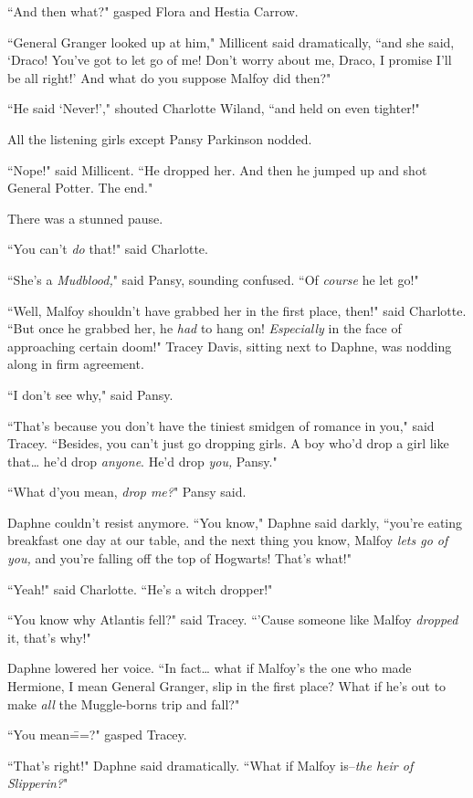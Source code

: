 ``And then what?" gasped Flora and Hestia Carrow.

``General Granger looked up at him," Millicent said dramatically, ``and she said, `Draco! You've got to let go of me! Don't worry about me, Draco, I promise I'll be all right!' And what do you suppose Malfoy did then?"

``He said `Never!'," shouted Charlotte Wiland, ``and held on even tighter!"

All the listening girls except Pansy Parkinson nodded.

``Nope!" said Millicent. ``He dropped her. And then he jumped up and shot General Potter. The end."

There was a stunned pause.

``You can't \emph{do} that!" said Charlotte.

``She's a \emph{Mudblood,}" said Pansy, sounding confused. ``Of \emph{course} he let go!"

``Well, Malfoy shouldn't have grabbed her in the first place, then!" said Charlotte. ``But once he grabbed her, he \emph{had} to hang on! \emph{Especially} in the face of approaching certain doom!" Tracey Davis, sitting next to Daphne, was nodding along in firm agreement.

``I don't see why," said Pansy.

``That's because you don't have the tiniest smidgen of romance in you," said Tracey. ``Besides, you can't just go dropping girls. A boy who'd drop a girl like that{\ldots} he'd drop \emph{anyone}. He'd drop \emph{you,} Pansy."

``What d'you mean, \emph{drop me?}" Pansy said.

Daphne couldn't resist anymore. ``You know," Daphne said darkly, ``you're eating breakfast one day at our table, and the next thing you know, Malfoy \emph{lets go of you,} and you're falling off the top of Hogwarts! That's what!"

``Yeah!" said Charlotte. ``He's a witch dropper!"

``You know why Atlantis fell?" said Tracey. ``'Cause someone like Malfoy \emph{dropped} it, that's why!"

Daphne lowered her voice. ``In fact{\ldots} what if Malfoy's the one who made Hermione, I mean General Granger, slip in the first place? What if he's out to make \emph{all} the Muggle-borns trip and fall?"

``You mean\===?" gasped Tracey.

``That's right!" Daphne said dramatically. ``What if Malfoy is\---\emph{the heir of Slipperin?}"

